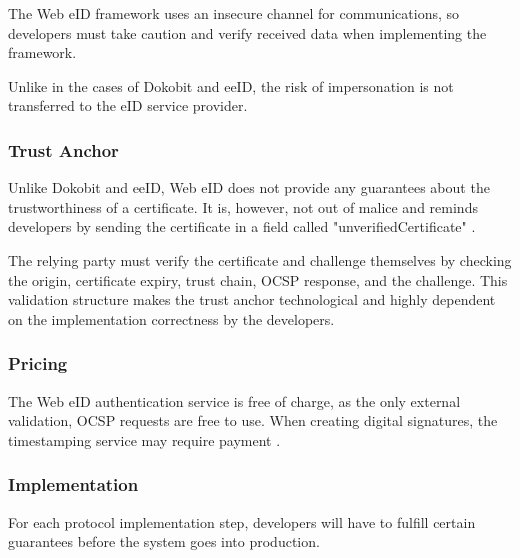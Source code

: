 The Web eID framework uses an insecure channel for communications, so developers must take caution and verify received data when implementing the framework.

Unlike in the cases of Dokobit and eeID, the risk of impersonation is not transferred to the eID service provider.


\subsubsection{Trust Anchor}

Unlike Dokobit and eeID, Web eID does not provide any guarantees about the trustworthiness of a certificate. It is, however, not out of malice and reminds developers by sending the certificate in a field called "unverifiedCertificate" \cite{ria-webeid-source-web-eid-authtoken-validation-java-readme}.

The relying party must verify the certificate and challenge themselves by checking the origin, certificate expiry, trust chain, OCSP response, and the challenge. This validation structure makes the trust anchor technological and highly dependent on the implementation correctness by the developers.


\subsubsection{Pricing}

The Web eID authentication service is free of charge, as the only external validation, OCSP \cite{rfc6960} requests are free to use. When creating digital signatures, the timestamping service may require payment \cite{ria-webeid-source-web-eid-authtoken-validation-java-readme}.

\subsubsection{Implementation}

For each protocol implementation step, developers will have to fulfill certain guarantees before the system goes into production.

